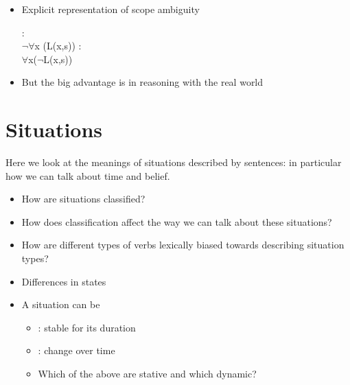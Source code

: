 \documentclass[headrule,footrule]{foils}
\begin{document}
\MyLogo{}

\begin{itemize}
\item Explicit representation of scope ambiguity
  \begin{exe}
    \ex {}
    \begin{xlist}
          \ex {}:  
          \\ $\neg\forall$x (L(x,s))
          \ex {}: 
          \\ $\forall$x($\neg$L(x,s))
    \end{xlist}
  \end{exe}
\item But the big advantage is in reasoning with the real world
   \\ 
\end{itemize}





\section{Situations}



Here we look at the meanings of situations described by sentences: 
in particular how we can talk about time and belief.

 \begin{itemize}
 \item  How are situations classified?
 \item  How does classification affect the way we can talk 
   about these situations?
 \item  How are different types of verbs lexically biased  
   towards describing situation types?
 \end{itemize}


\begin{itemize}
\item  Differences in states  
  \begin{exe}
    \ex {}
    \ex {}
    \ex {}
    \ex {}
  \end{exe}
\item  A situation can be 
  \begin{itemize}
  \item  {}: stable for its duration
  \item  {}: change over time
  \item  Which of the above are stative and which dynamic?    
  \end{itemize}
\end{itemize}
\end{document}
